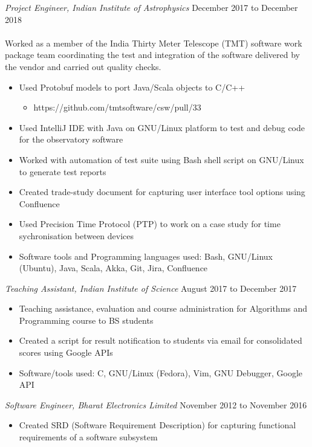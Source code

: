 \documentclass[line, margin]{res}
\begin{document}
\begin{resume}
  \textit{Project Engineer, Indian Institute of Astrophysics} \hfill
  December 2017 to December 2018 \\
  \\Worked as a member of the India Thirty Meter Telescope (TMT)
    software work package team coordinating the test and integration
    of the software delivered by the vendor and carried out quality
    checks.\\
  \begin{itemize}
  \item Used Protobuf models to port Java/Scala objects to C/C++
    \begin{itemize}
    \item https://github.com/tmtsoftware/csw/pull/33
      \end{itemize}
  \item Used IntelliJ IDE with Java on GNU/Linux platform to test and debug code for the observatory software
  \item Worked with automation of test suite using Bash shell script on GNU/Linux to generate test reports
  \item Created trade-study document for capturing user interface tool
    options using Confluence
  \item Used Precision Time Protocol (PTP) to work on a case study for time sychronisation between devices
  \item Software tools and Programming languages used: Bash, GNU/Linux (Ubuntu), Java, Scala, Akka, Git, Jira, Confluence
  \end{itemize}
  \textit{Teaching Assistant, Indian Institute of Science} \hfill August 2017 to December 2017 \\
  \begin{itemize}
  \item Teaching assistance, evaluation and course administration for Algorithms and Programming course to BS students
  \item Created a script for result notification to students via email for consolidated scores using Google APIs
  \item Software/tools used: C, GNU/Linux (Fedora), Vim, GNU Debugger, Google API
  \end{itemize}
  \textit{Software Engineer, Bharat Electronics Limited} \hfill November 2012 to November 2016 \\
  \begin{itemize}
  \item Created SRD (Software Requirement Description) for capturing functional requirements of a software subsystem

\end{itemize}
\end{resume}
\end{document}
